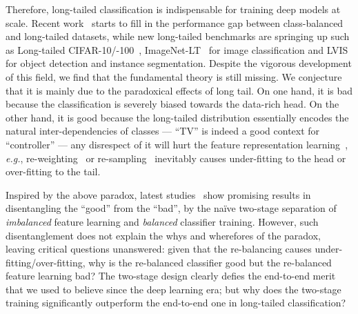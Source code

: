 \documentclass{article}
\newcommand{\eg}{\textit{e.g.}}
\begin{document}
Therefore, long-tailed classification is indispensable for training deep models at scale. Recent work~\cite{liu2019large, zhou2019bbn, kang2019decoupling} starts to fill in the performance gap between class-balanced and long-tailed datasets, while new long-tailed benchmarks are springing up such as Long-tailed CIFAR-10/-100~\cite{cao2019learning, zhou2019bbn}, ImageNet-LT~\cite{liu2019large} for image classification and LVIS~\cite{gupta2019lvis} for object detection and instance segmentation. Despite the vigorous development of this field, we find that the fundamental theory is still missing. We conjecture that it is mainly due to the paradoxical effects of long tail. On one hand, it is bad because the classification is severely biased towards the data-rich head. On the other hand, it is good because the long-tailed distribution essentially encodes the natural inter-dependencies of classes --- ``TV'' is indeed a good context for ``controller'' --- any disrespect of it will hurt the feature representation learning~\cite{zhou2019bbn}, \eg, re-weighting~\cite{cui2019class, khan2017cost} or re-sampling~\cite{shen2016relay, mahajan2018exploring} inevitably causes under-fitting to the head or over-fitting to the tail. 

Inspired by the above paradox, latest studies~\cite{zhou2019bbn, kang2019decoupling} show promising results in disentangling the ``good'' from the ``bad'', by the na\"ive two-stage separation of \emph{imbalanced} feature learning and \emph{balanced} classifier training.  However, such disentanglement does not explain the whys and wherefores of the paradox, leaving critical questions unanswered: given that the re-balancing causes under-fitting/over-fitting, why is the re-balanced classifier good but the re-balanced feature learning bad? The two-stage design clearly defies the end-to-end merit that we used to believe since the deep learning era; but why does the two-stage training significantly outperform the end-to-end one in long-tailed classification?
\end{document}
